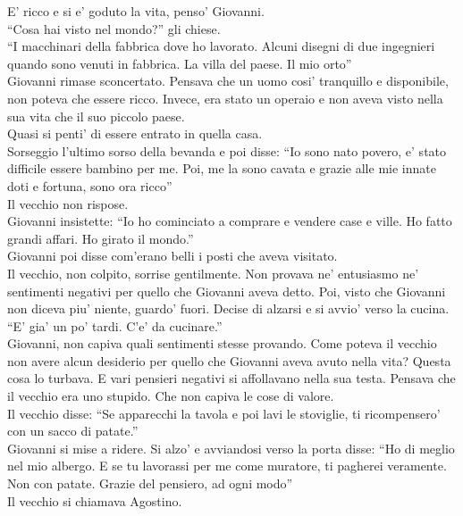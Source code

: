 E' ricco e si e' goduto la vita, penso' Giovanni.\\
\enquote{Cosa hai visto nel mondo?} gli chiese.\\
\enquote{I macchinari della fabbrica dove ho lavorato. Alcuni disegni di due ingegnieri quando sono venuti in fabbrica. La villa del paese. Il mio orto}\\
Giovanni rimase sconcertato. Pensava che un uomo cosi' tranquillo e disponibile, non poteva che essere ricco. Invece, era stato un operaio e non aveva visto nella sua vita che il suo piccolo paese.\\
Quasi si penti' di essere entrato in quella casa.\\
Sorseggio l'ultimo sorso della bevanda e poi disse: \enquote{Io sono nato povero, e' stato difficile essere bambino per me. Poi, me la sono cavata e grazie alle mie innate doti e fortuna, sono ora ricco}\\
Il vecchio non rispose.\\
Giovanni insistette: \enquote{Io ho cominciato a comprare e vendere case e ville. Ho fatto grandi affari. Ho girato il mondo.}\\
Giovanni poi disse com'erano belli i posti che aveva visitato.\\
Il vecchio, non colpito, sorrise gentilmente. Non provava ne' entusiasmo ne' sentimenti negativi per quello che Giovanni aveva detto. Poi, visto che Giovanni non diceva piu' niente, guardo' fuori. Decise di alzarsi e si avvio' verso la cucina. \enquote{E' gia' un po' tardi. C'e' da cucinare.}\\

Giovanni, non capiva quali sentimenti stesse provando. Come poteva il vecchio non avere alcun desiderio per quello che Giovanni aveva avuto nella vita? Questa cosa lo turbava. E vari pensieri negativi si affollavano nella sua testa. Pensava che il vecchio era uno stupido. Che non capiva le cose di valore.\\

Il vecchio disse: \enquote{Se apparecchi la tavola e poi lavi le stoviglie, ti ricompensero' con un sacco di patate.}\\
Giovanni si mise a ridere. Si alzo' e avviandosi verso la porta disse: \enquote{Ho di meglio nel mio albergo. E se tu lavorassi per me come muratore, ti pagherei veramente. Non con patate. Grazie del pensiero, ad ogni modo}\\

Il vecchio si chiamava Agostino.\\

